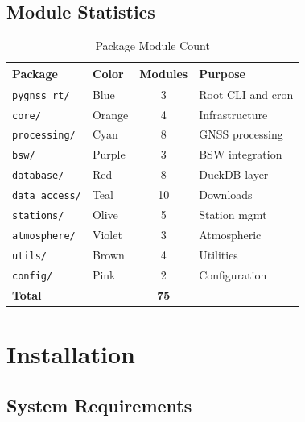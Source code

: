 \documentclass[11pt,a4paper,twoside]{report}
\begin{document}
\section{Module Statistics}

\begin{table}[H]
\centering
\caption{Package Module Count}
\label{tab:module-count}
\begin{tabular}{@{}llcp{5cm}@{}}
\toprule
\textbf{Package} & \textbf{Color} & \textbf{Modules} & \textbf{Purpose} \\
\midrule
\texttt{pygnss\_rt/} & \cellcolor{primaryblue!15} Blue & 3 & Root CLI and cron \\
\texttt{core/} & \cellcolor{accentorange!15} Orange & 4 & Infrastructure \\
\texttt{processing/} & \cellcolor{infocyan!15} Cyan & 8 & GNSS processing \\
\texttt{bsw/} & \cellcolor{purple!15} Purple & 3 & BSW integration \\
\texttt{database/} & \cellcolor{warningred!15} Red & 8 & DuckDB layer \\
\texttt{data\_access/} & \cellcolor{teal!15} Teal & 10 & Downloads \\
\texttt{stations/} & \cellcolor{olive!15} Olive & 5 & Station mgmt \\
\texttt{atmosphere/} & \cellcolor{violet!15} Violet & 3 & Atmospheric \\
\texttt{utils/} & \cellcolor{brown!15} Brown & 4 & Utilities \\
\texttt{config/} & \cellcolor{pink!15} Pink & 2 & Configuration \\
\midrule
\textbf{Total} & & \textbf{75} & \\
\bottomrule
\end{tabular}
\end{table}

\chapter{Installation}

\section{System Requirements}
\end{document}
